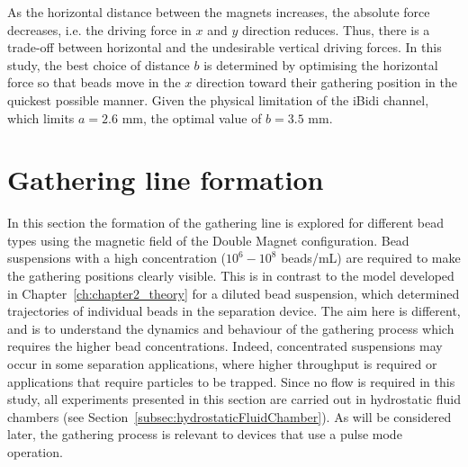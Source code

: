 As the horizontal distance between the magnets increases, the absolute force decreases, i.e. the driving force in $x$ and $y$ direction reduces. Thus, there is a trade-off between horizontal and the undesirable vertical driving forces. In this study, the best choice of distance $b$ is determined by optimising the horizontal force so that beads move in the $x$ direction toward their gathering position in the quickest possible manner. Given the physical limitation of the iBidi channel, which limits $a=2.6$ mm, the optimal value of $b=3.5$ mm. 



\section{Gathering line formation}\label{sec:gatheringLineFormation}
In this section the formation of the gathering line is explored  for different bead types using the magnetic field of the Double Magnet configuration. Bead suspensions with a high concentration ($10^6-10^8$ beads/mL) are required to make the gathering positions clearly visible. This is in contrast to the model developed in Chapter~\ref{ch:chapter2_theory} for a diluted bead suspension, which determined trajectories of individual beads in the separation device. The aim here is different, and is to understand the dynamics and behaviour of the gathering process which requires the higher bead concentrations. Indeed, concentrated suspensions may occur in some separation applications, where higher throughput is required or applications that require particles to be trapped. Since no flow is required in this study, all experiments presented in this section are carried out in hydrostatic fluid chambers (see Section~\ref{subsec:hydrostaticFluidChamber}). As will be considered later, the gathering process is relevant to devices that use a pulse mode operation.

